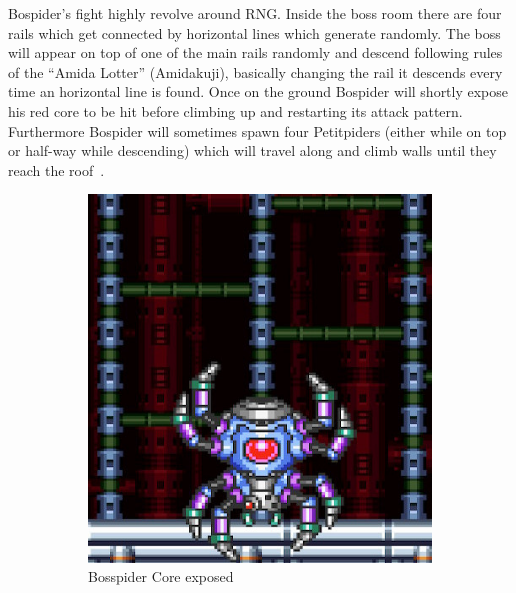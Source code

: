 Bospider's fight highly revolve around RNG. Inside the boss room there are four rails which get connected by horizontal lines which generate randomly. The boss will appear on top of one of the main rails randomly and descend following rules of the ``Amida Lotter'' (Amidakuji), basically changing the rail it descends every time an horizontal line is found. Once on the ground Bospider will shortly expose his red core to be hit before climbing up and restarting its attack pattern. Furthermore Bospider will sometimes spawn four Petitpiders (either while on top or half-way while descending) which will travel along and climb walls until they reach the roof~\cite{wiki:Bospider}.
\begin{figure}[htp]
	\centering
	\begin{subfigure}[t]{0.40\linewidth}
		\centering
		\includegraphics[width=\linewidth]{figures/X1/Sigma_stages/Bospider_core.jpg}
		\caption{Bosspider Core exposed}
	\end{subfigure}
	\begin{subfigure}[t]{0.45\linewidth}
		\centering

\end{subfigure}
\end{figure}
